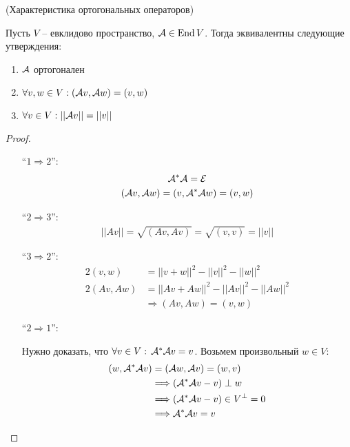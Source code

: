 \begin{theorem}(Характеристика ортогональных операторов)

    Пусть $V$ -- евклидово пространство, $\mathcal{A} \in \operatorname{End}{V}$.
    Тогда эквивалентны следующие утверждения:
    \begin{enumerate}
        \item $\mathcal{A}$ ортогонален
        \item $\forall v, w \in V: (\mathcal{A} v, \mathcal{A} w) = (v, w)$
        \item $\forall v \in V: ||\mathcal{A} v|| = || v || $
    \end{enumerate}
    \begin{proof} \quad

        \begin{itemize}
            \item[``$1 \Rightarrow 2$'':]
            \begin{gather*}
                \mathcal{A}^* \mathcal{A} = \mathcal{E} \\
                (\mathcal{A} v, \mathcal{A} w) = (v, \mathcal{A}^*\mathcal{A} w) = (v, w)
            \end{gather*} 
            \item[``$2 \Rightarrow 3$'':]
            \begin{gather*}
                ||Av|| = \sqrt{(Av, Av)} = \sqrt{(v, v)} = ||v||
            \end{gather*} 
            \item[``$3 \Rightarrow 2$'':]
            \begin{align*}
                2(v, w) &= ||v + w||^2 - ||v||^2 - ||w||^2 \\
                2(Av, Aw) &= ||Av + Aw||^2 - ||Av||^2 - ||Aw||^2 \\
                &\Longrightarrow (Av, Aw) = (v, w)
            \end{align*}  
            \item[``$2 \Rightarrow 1$'':]  \quad
             
            Нужно доказать, что $\forall v \in V: \, \mathcal{A}^* \mathcal{A} v = v$. Возьмем произвольный $w \in V$:
            \begin{align*}
                (w, \mathcal{A}^* \mathcal{A} v) &= (\mathcal{A} w, \mathcal{A} v) = (w, v) \\
                &\Longrightarrow (\mathcal{A}^* \mathcal{A} v - v) \perp w \\
                &\Longrightarrow (\mathcal{A}^* \mathcal{A} v - v) \in V^{\perp} = 0 \\
                &\Longrightarrow \mathcal{A}^* \mathcal{A} v = v
            \end{align*} 
        \end{itemize}
    \end{proof}    
\end{theorem}


